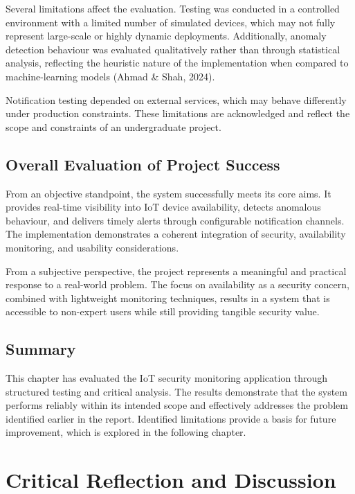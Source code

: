 Several limitations affect the evaluation. Testing was conducted in a controlled environment with a limited number of simulated devices, which may not fully represent large-scale or highly dynamic deployments. Additionally, anomaly detection behaviour was evaluated qualitatively rather than through statistical analysis, reflecting the heuristic nature of the implementation when compared to machine-learning models (Ahmad \& Shah, 2024).

Notification testing depended on external services, which may behave differently under production constraints. These limitations are acknowledged and reflect the scope and constraints of an undergraduate project.

\section{Overall Evaluation of Project Success}

From an objective standpoint, the system successfully meets its core aims. It provides real-time visibility into IoT device availability, detects anomalous behaviour, and delivers timely alerts through configurable notification channels. The implementation demonstrates a coherent integration of security, availability monitoring, and usability considerations.

From a subjective perspective, the project represents a meaningful and practical response to a real-world problem. The focus on availability as a security concern, combined with lightweight monitoring techniques, results in a system that is accessible to non-expert users while still providing tangible security value.

\section{Summary}

This chapter has evaluated the IoT security monitoring application through structured testing and critical analysis. The results demonstrate that the system performs reliably within its intended scope and effectively addresses the problem identified earlier in the report. Identified limitations provide a basis for future improvement, which is explored in the following chapter.

\chapter{Critical Reflection and Discussion}

